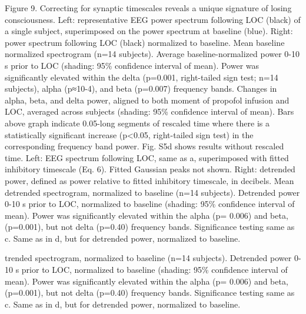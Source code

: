 Figure 9. Correcting for synaptic timescales reveals a unique signature of losing consciousness.
	Left: representative EEG power spectrum following LOC (black) of a single subject, superimposed on the power spectrum at baseline (blue). Right: power spectrum following LOC (black) normalized to baseline. 
	Mean baseline normalized spectrogram (n=14 subjects).
	Average baseline-normalized power 0-10 s prior to LOC (shading: 95\% confidence interval of mean). Power was significantly elevated within the delta (p=0.001, right-tailed sign test; n=14 subjects), alpha (p≈10-4), and beta (p=0.007) frequency bands.
	Changes in alpha, beta, and delta power, aligned to both moment of propofol infusion and LOC, averaged across subjects (shading: 95\% confidence interval of mean). Bars above graph indicate 0.05-long segments of rescaled time where there is a statistically significant increase (p<0.05, right-tailed sign test) in the corresponding frequency band power. Fig. S5d shows results without rescaled time. 
	Left: EEG spectrum following LOC, same as a, superimposed with fitted inhibitory timescale (Eq. 6). Fitted Gaussian peaks not shown. Right: detrended power, defined as power relative to fitted inhibitory timescale, in decibels. 
	Mean detrended spectrogram, normalized to baseline (n=14 subjects).
	Detrended power 0-10 s prior to LOC, normalized to baseline (shading: 95\% confidence interval of mean). Power was significantly elevated within the alpha (p= 0.006) and beta, (p=0.001), but not delta (p=0.40) frequency bands. Significance testing same as c.
	Same as in d, but for detrended power, normalized to baseline.

trended spectrogram, normalized to baseline (n=14 subjects).
	Detrended power 0-10 s prior to LOC, normalized to baseline (shading: 95\% confidence interval of mean). Power was significantly elevated within the alpha (p= 0.006) and beta, (p=0.001), but not delta (p=0.40) frequency bands. Significance testing same as c.
	Same as in d, but for detrended power, normalized to baseline.



